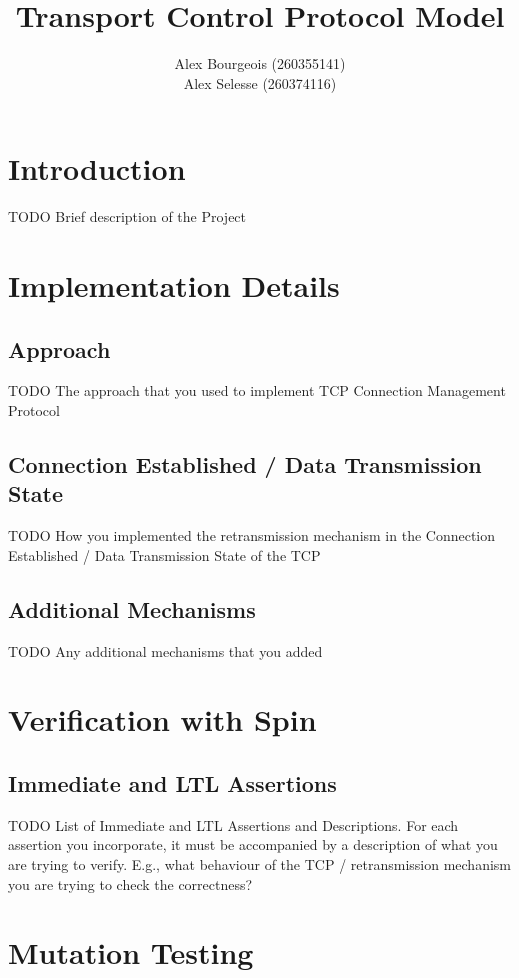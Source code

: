 \documentclass{WigReport}
\title{Transport Control Protocol Model}
\author{Alex Bourgeois (260355141) \\
Alex Selesse (260374116)}
\begin{document}
\MakeTitlePage
\tableofcontents
\clearpage

\section{Introduction}

TODO Brief description of the Project

\section{Implementation Details}

\subsection{Approach}

TODO The approach that you used to implement TCP Connection Management Protocol

\subsection{Connection Established / Data Transmission State}

TODO How you implemented the retransmission mechanism in the Connection Established / Data Transmission State of the TCP

\subsection{Additional Mechanisms}

TODO Any additional mechanisms that you added

\section{Verification with Spin}

\subsection{Immediate and LTL Assertions}

TODO List of Immediate and LTL Assertions and Descriptions. For each assertion you incorporate, it must be accompanied by a description of what you are trying to verify. E.g., what behaviour of the TCP / retransmission mechanism you are trying to check the correctness?

\section{Mutation Testing}
\end{document}
